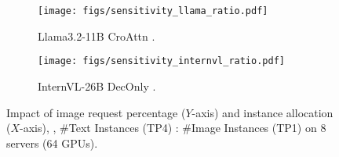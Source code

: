 \begin{figure}[!t]
  \centering
  \begin{subfigure}[b]{\linewidth}
    \centering
    \texttt{[image: figs/sensitivity\_llama\_ratio.pdf]}
    \caption{Llama3.2-11B CroAttn \lmm{}.}
    \label{fig:eval:sensitivity-ratio-llama}
  \end{subfigure}%
  \hfill
  \begin{subfigure}[b]{\linewidth}
    \centering
    \texttt{[image: figs/sensitivity\_internvl\_ratio.pdf]}
    \caption{InternVL-26B DecOnly \lmm{}.}
    \label{fig:eval:sensitivity-ratio-internvl}
  \end{subfigure}%
  \caption{Impact of image request percentage ($Y$-axis) and instance allocation ($X$-axis), \ie{}, \#Text Instances (TP4) : \#Image Instances (TP1) on 8 servers (64 GPUs).}
  \vspace{-10pt}
  \label{fig:eval:sensitivity-ratio}
\end{figure}